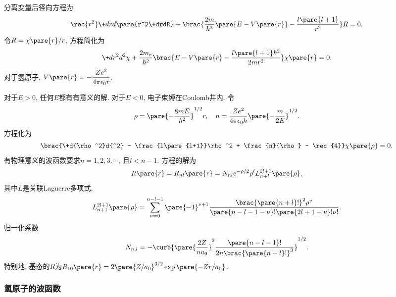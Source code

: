 \documentclass[hidelinks]{ctexart}
\begin{document}
分离变量后径向方程为
\[ \rec{r^2}\+drd{}\pare{r^2\+drdR} + \brac{\frac{2m}{\hbar^2}\pare{E-V\pare{r}} - \frac{l\pare{l+1}}{r^2}}R = 0. \]
令$R = \chi\pare{r}/r$, 方程简化为
\[ \+d{r^2}d{^2 \chi} + \frac{2m_e}{\hbar^2} \brac{E - V\pare{r} - \frac{l\pare{l+1}\hbar^2}{2mr^2}}\chi\pare{r} = 0. \]
对于氢原子, $\displaystyle V\pare{r} = -\frac{Ze^2}{4\pi\epsilon_0 r}$.
\par
对于$E>0$, 任何$E$都有有意义的解. 对于$E<0$, 电子束缚在Coulomb井内. 令
\[ \rho = \pare{-\frac{8mE}{\hbar^2}}^{1/2}r,\quad n = \frac{Ze^2}{4\pi\epsilon_0 \hbar}\pare{-\frac{m}{2E}}^{1/2}. \]
方程化为
\[ \brac{\+d{\rho^2}d{^2} - \frac{l\pare{l+1}}\rho^2 + \frac{n}{\rho} - \rec{4}}\chi\pare{\rho} = 0. \]
有物理意义的波函数要求$n=1,2,3,\cdots$, 且$l<n-1$. 方程的解为
\[ R\pare{r} = R_{nl}\pare{r} = N_{nl}e^{-\rho/2} \rho^l L_{n+l}^{2l+1}\pare{\rho}, \]
其中$L$是关联Laguerre多项式,
\[ L_{n+1}^{2l+1}\pare{\rho} = \sum_{\nu = 0}^{n-l-1} \pare{-1}^{\nu + 1} \frac{\brac{\pare{n+l}!}^2\rho^v}{\pare{n-l-1-\nu}!\pare{2l+1+\nu}!\nu!}. \]
归一化系数
\[ N_{n,l} = -\curb{\pare{\frac{2Z}{na_0}}^3 \frac{\pare{n-l-1}!}{2n\brac{\pare{n+l}!}^3}}^{1/2}. \]
特别地, 基态的$R$为$R_{10}\pare{r} = 2\pare{Z/a_0}^{3/2}\exp\pare{-Zr/a_0}$.


\subsubsection{氢原子的波函数} %
\label{ssub:氢原子的波函数}
\end{document}
